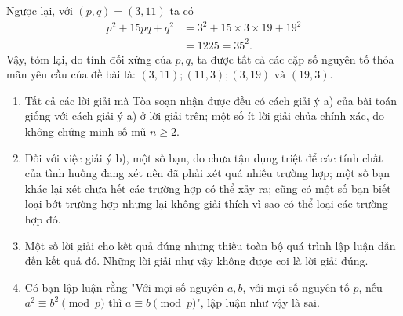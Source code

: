 \begin{bt}
{		Ngược lại, với $(p,q)=(3,11)$ ta có 
		\begin{align*} 
		p^2+15pq+q^2&=3^2+15\times 3\times 19 +19^2\\
		&=1225=35^2.
		\end{align*}
		Vậy, tóm lại, do tính đối xứng của $p,q$, ta được tất cả các cặp số nguyên tố thỏa mãn yêu cầu của đề bài là: $(3,11);(11,3);(3,19)\text{ và } (19,3)$.
		\begin{nx}\hfill
			\begin{enumerate}
				\item Tất cả các lời giải mà Tòa soạn nhận được đều có cách giải ý a) của bài toán giống với cách giải ý a) ở lời giải trên; một số ít lời giải chủa chính xác, do không chứng minh số mũ $n\ge 2$.
				\item Đối với việc giải ý b), một số bạn, do chưa tận dụng triệt để các tính chất của tình huống đang xét nên đã phải xét quá nhiều trường hợp; một số bạn khác lại xét chưa hết các trường hợp có thể xảy ra; cũng có một số bạn biết loại bớt trường hợp nhưng lại không giải thích vì sao có thể loại các trường hợp đó.
				\item Một số lời giải cho kết quả đúng nhưng thiếu toàn bộ quá trình lập luận dẫn đến kết quả đó. Những lời giải như vậy không được coi là lời giải đúng.
				\item Có bạn lập luận rằng "Với mọi số nguyên $a,b$, với mọi số nguyên tố $p$, nếu $a^2\equiv b^2 \pmod{p}$ thì $a\equiv b \pmod{p}$", lập luận như vậy là sai.
			\end{enumerate}
		\end{nx}
	}
\end{bt}

